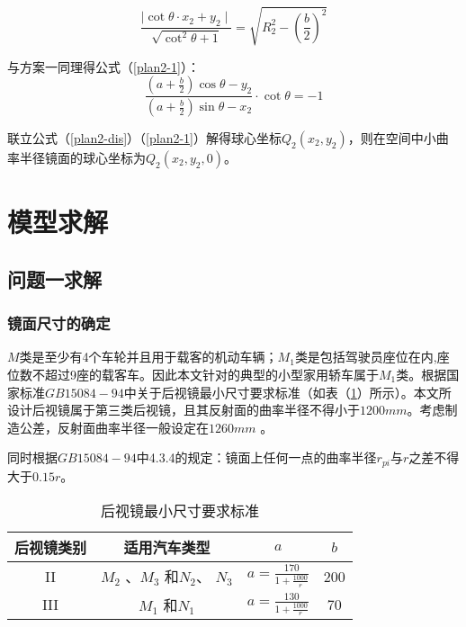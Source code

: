 \documentclass[withoutpreface,bwprint]{cumcmthesis} %
\begin{document}
\begin{equation}
\label{plan2-dis}
	\frac{\mid \mathop{cot}\theta \cdot x_2 + y_2 \mid}{\sqrt{\mathop{cot}^{2} \theta + 1}} = \sqrt{R_2^2 - \left( \frac{b}{2} \right)^2} 	
\end{equation}
\par 与方案一同理得公式（\ref{plan2-1}）：
\begin{equation}
\label{plan2-1}
	\frac{\left(a + \frac{b}{2}\right) \mathop{cos} \theta - y_2}{\left( a+ \frac{b}{2} \right) \mathop{sin} \theta - x_2} \cdot \mathop{cot}\theta = -1
\end{equation}
\par 联立公式（\ref{plan2-dis}）（\ref{plan2-1}）解得球心坐标$Q_2(x_2,y_2)$，则在空间中小曲率半径镜面的球心坐标为$Q_2(x_2,y_2,0)$。

\section{模型求解}

\subsection{问题一求解}

\subsubsection{镜面尺寸的确定}
\par $M$类是至少有4个车轮并且用于载客的机动车辆；$M_1$类是包括驾驶员座位在内,座位数不超过9座的载客车。因此本文针对的典型的小型家用轿车属于$M_1$类。根据国家标准$GB 15084-94$中关于后视镜最小尺寸要求标准（如表（\ref{后视镜最小尺寸要求标准}）所示）。本文所设计后视镜属于第三类后视镜，且其反射面的曲率半径不得小于$1200mm$。考虑制造公差，反射面曲率半径一般设定在$1260mm$ 。

\par 同时根据$GB 15084-94$中4.3.4的规定：镜面上任何一点的曲率半径$r_{pi}$与$r$之差不得大于$0.15r$。

\begin{table}[!htbp]
\centering
\caption{后视镜最小尺寸要求标准}
\label{后视镜最小尺寸要求标准}
\begin{tabular}{cccc}
\toprule
后视镜类别 & 适用汽车类型 & $a$ & $b$	\\ \midrule
 II	 & $M_2$ 、$M_3$ 和$N_2$、 $N_3$ &  $a =  \frac{170}{1+\frac{1000}{r}}$& 200\\ 
III & $M_1$ 和$N_1$& $a =  \frac{130}{1+\frac{1000}{r}}$&  70\\ 
\bottomrule 
\end{tabular}
\end{table}
\end{document}
